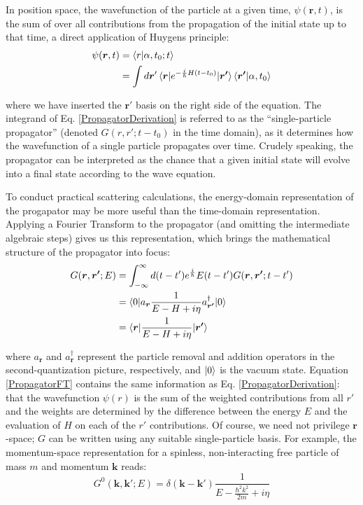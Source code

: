 \noindent
In position space, the wavefunction of the particle at a given time, $\psi(\bm{r},t)$,
is the sum of over all contributions from the propagation of the initial state up to that time,
a direct application of Huygens principle:
\begin{equation} \label{PropagatorDerivation}
    \begin{split}
        \psi(\bm{r},t) & = \braket{r|\alpha, t_{0}; t}\\
        & = \int d\bm{r}'
        \braket{\bm{r}|e^{-\frac{i}{\hbar}H(t-t_{0})}|\bm{r'}}\braket{\bm{r'}|\alpha,t_{0}}
    \end{split}
\end{equation}

\noindent
where we have inserted the $\bm{r'}$ basis on the right side of the equation.
The integrand of Eq. \ref{PropagatorDerivation} is referred to as the ``single-particle propagator'' 
(denoted $G(r, r'; t-t_{0})$ in the time domain),
as it determines how the wavefunction of a single particle
propagates over time. Crudely speaking, the propagator can be interpreted as the chance that a given
initial state will evolve into a final state according to the wave equation.

To conduct practical scattering calculations, the energy-domain representation of the progapator
may be more useful than the time-domain representation. Applying a Fourier Transform to the propagator
(and omitting the intermediate algebraic steps) gives us this representation, which brings the mathematical
structure of the propagator into focus:
\begin{equation} \label{PropagatorFT}
    \begin{split}
        G(\bm{r},\bm{r'};E) & = \int_{-\infty}^{\infty}d(t-t')e^\frac{i}{\hbar}E(t-t')G(\bm{r},\bm{r'}; t-t')\\
        & = \braket{0|a_{\bm{r}}\frac{1}{E-H+i\eta}a^{\dagger}_{\bm{r'}}|0}\\
        & = \braket{\bm{r} | \frac{1}{E-H+i\eta} | \bm{r'}}
    \end{split}
\end{equation}

\noindent
where $a_{\bm{r}}$ and $a^{\dagger}_{\bm{r}}$ represent the particle removal and
addition operators in
the second-quantization picture, respectively, and $\ket{0}$ is the vacuum state.
Equation \ref{PropagatorFT} contains the same information as Eq. \ref{PropagatorDerivation}: that
the wavefunction $\psi(r)$ is the sum of the weighted contributions from all $r'$ and the weights
are determined by the difference between the energy $E$ and the evaluation of $H$ on each of the $r'$
contributions. Of course, we need not privilege $\bm{r}$-space; $G$ can be written using any
suitable single-particle basis. For example, the momentum-space representation for a spinless,
non-interacting free particle of mass $m$ and momentum $\bm{k}$ reads:
\begin{equation} \label{PropagatorKSpace}
    G^{0}(\bm{k}, \bm{k'}; E) = \delta(\bm{k}-\bm{k'})\frac{1}{E-\frac{\hbar^{2}k^{2}}{2m} + i\eta}
\end{equation}


